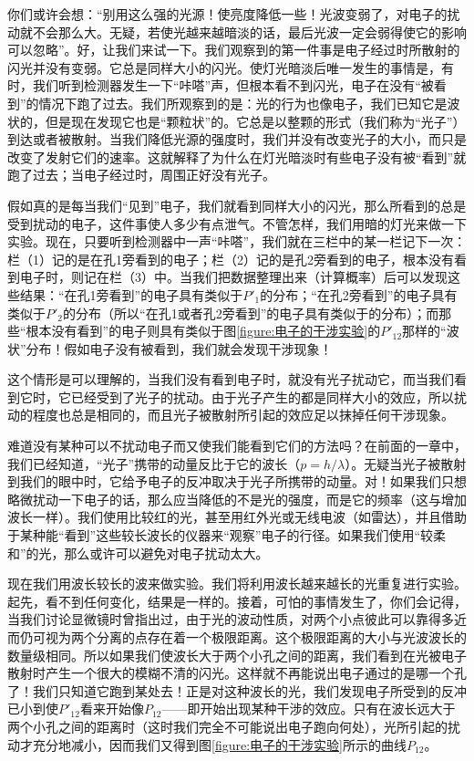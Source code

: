 你们或许会想：“别用这么强的光源！使亮度降低一些！光波变弱了，对电子的扰动就不会那么大。无疑，若使光越来越暗淡的话，最后光波一定会弱得使它的影响可以忽略”。好，让我们来试一下。我们观察到的第一件事是电子经过时所散射的闪光并没有变弱。它总是同样大小的闪光。使灯光暗淡后唯一发生的事情是，有时，我们听到检测器发生一下“咔嗒”声，但根本看不到闪光，电子在没有“被看到”的情况下跑了过去。我们所观察到的是：光的行为也像电子，我们已知它是波状的，但是现在发现它也是“颗粒状”的。它总是以整颗的形式（我们称为“光子”）到达或者被散射。当我们降低光源的强度时，我们并没有改变光子的大小，而只是改变了发射它们的速率。这就解释了为什么在灯光暗淡时有些电子没有被“看到”就跑了过去；当电子经过时，周围正好没有光子。

假如真的是每当我们“见到”电子，我们就看到同样大小的闪光，那么所看到的总是受到扰动的电子，这件事使人多少有点泄气。不管怎样，我们用暗的灯光来做一下实验。现在，只要听到检测器中一声“咔嗒”，我们就在三栏中的某一栏记下一次：栏（1）记的是在孔1旁看到的电子；栏（2）记的是孔2旁看到的电子，根本没有看到电子时，则记在栏（3）中。当我们把数据整理出来（计算概率）后可以发现这些结果：“在孔1旁看到”的电子具有类似于$P'_1$的分布；“在孔2旁看到”的电子具有类似于$P'_2$的分布（所以“在孔1或者孔2旁看到”的电子具有类似于的分布）；而那些“根本没有看到”的电子则具有类似于图\ref{figure:电子的干涉实验}的$P'_{12}$那样的“波状”分布！假如电子没有被看到，我们就会发现干涉现象！

这个情形是可以理解的，当我们没有看到电子时，就没有光子扰动它，而当我们看到它时，它已经受到了光子的扰动。由于光子产生的都是同样大小的效应，所以扰动的程度也总是相同的，而且光子被散射所引起的效应足以抹掉任何干涉现象。

难道没有某种可以不扰动电子而又使我们能看到它们的方法吗？在前面的一章中，我们已经知道，“光子”携带的动量反比于它的波长（$p=h/\lambda$）。无疑当光子被散射到我们的眼中时，它给予电子的反冲取决于光子所携带的动量。对！如果我们只想略微扰动一下电子的话，那么应当降低的不是光的强度，而是它的频率（这与增加波长一样）。我们使用比较红的光，甚至用红外光或无线电波（如雷达），并且借助于某种能“看到”这些较长波长的仪器来“观察”电子的行径。如果我们使用“较柔和”的光，那么或许可以避免对电子扰动太大。

现在我们用波长较长的波来做实验。我们将利用波长越来越长的光重复进行实验。起先，看不到任何变化，结果是一样的。接着，可怕的事情发生了，你们会记得，当我们讨论显微镜时曾指出过，由于光的波动性质，对两个小点彼此可以靠得多近而仍可视为两个分离的点存在着一个极限距离。这个极限距离的大小与光波波长的数量级相同。所以如果我们使波长大于两个小孔之间的距离，我们看到在光被电子散射时产生一个很大的模糊不清的闪光。这样就不再能说出电子通过的是哪一个孔了！我们只知道它跑到某处去！正是对这种波长的光，我们发现电子所受到的反冲已小到使$P'_{12}$看来开始像$P_{12}$——即开始出现某种干涉的效应。只有在波长远大于两个小孔之间的距离时（这时我们完全不可能说出电子跑向何处），光所引起的扰动才充分地减小，因而我们又得到图\ref{figure:电子的干涉实验}所示的曲线$P_{12}$。

